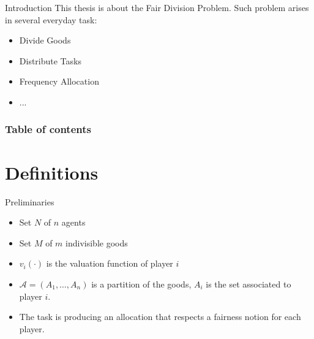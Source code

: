 
\begin{frame}[t,plain]
\titlepage
\end{frame}

\begin{frame}{Introduction}
    This thesis is about the Fair Division Problem. Such problem arises in several everyday task:
    \begin{itemize}
        \item Divide Goods
        \item Distribute Tasks
        \item Frequency Allocation
        \item ...
    \end{itemize}
\end{frame}

\begin{frame}
\frametitle{Table of contents}
\tableofcontents
\end{frame}


\section{Definitions}


\begin{frame}{Preliminaries}
    \begin{itemize}
        \item Set $N$ of $n$ agents
        \item Set $M$ of $m$ indivisible goods
        \item $v_i(\cdot)$ is the valuation function of player $i$
        \item $\mathcal{A} = (A_1, \dots, A_n)$ is a partition of the goods, $A_i$ is the set associated to player $i$.
        \item The task is producing an allocation that respects a fairness notion for each player.
    \end{itemize}
\end{frame}


